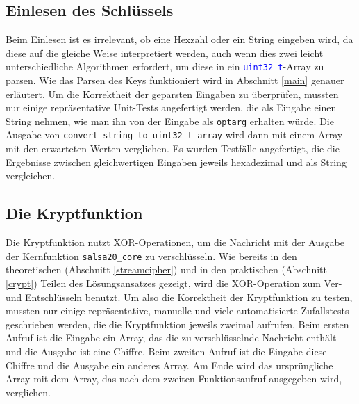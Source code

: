 \documentclass[course=erap]{aspdoc}
\begin{document}
\subsection{Einlesen des Schlüssels}
Beim Einlesen ist es irrelevant, ob eine Hexzahl oder ein String eingeben wird, da diese auf die gleiche Weise interpretiert werden, 
auch wenn dies zwei leicht unterschiedliche Algorithmen erfordert, um diese in ein \texttt{\textcolor{blue}{uint32\_t}}-Array zu parsen. 
Wie das Parsen des Keys funktioniert wird in Abschnitt \ref{main} genauer erläutert.
Um die Korrektheit der geparsten Eingaben zu überprüfen, mussten nur einige repräsentative Unit-Tests angefertigt werden, 
die als Eingabe einen String nehmen, wie man ihn von der Eingabe als \texttt{optarg} erhalten würde. Die Ausgabe 
von \texttt{convert\_string\_to\_uint32\_t\_array} wird dann mit einem Array mit den erwarteten Werten verglichen.
Es wurden Testfälle angefertigt, die die Ergebnisse zwischen gleichwertigen Eingaben jeweils hexadezimal und als String ver\-glei\-chen.


\subsection{Die Kryptfunktion}
Die Kryptfunktion nutzt XOR-Operationen, um die Nachricht mit der Ausgabe der Kernfunktion \texttt{salsa20\_core} zu verschlüsseln.
Wie bereits in den theoretischen (Abschnitt \ref{streamcipher}) und in den praktischen (Abschnitt \ref{crypt}) Teilen des Lösungsansatzes gezeigt,
wird die XOR-Operation zum Ver- und Entschlüsseln benutzt. 
Um also die Korrektheit der Kryptfunktion zu testen, mussten nur einige repräsentative, manuelle
und viele automatisierte Zufallstests geschrieben werden, die die Kryptfunktion jeweils zweimal aufrufen.
Beim ersten Aufruf ist die Eingabe ein Array, das die zu verschlüsselnde Nachricht enthält und die Ausgabe ist eine Chiffre. 
Beim zweiten Aufruf ist die Eingabe diese Chiffre und die Ausgabe ein anderes Array. 
Am Ende wird das ursprüngliche Array mit dem Array, das nach dem zweiten 
Funktionsaufruf ausgegeben wird, ver\-gli\-chen.
\end{document}
